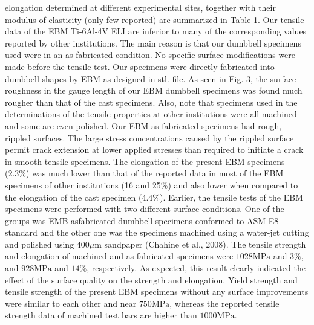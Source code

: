 \documentclass[10pt]{article}
\begin{document}
elongation determined at different experimental sites, together with their modulus of elasticity (only few reported) are summarized in Table 1. Our tensile data of the EBM Ti-6Al-4V ELI are inferior to many of the corresponding values reported by other institutions. The main reason is that our dumbbell specimens used were in an as-fabricated condition. No specific surface modifications were made before the tensile test. Our specimens were directly fabricated into dumbbell shapes by EBM as designed in stl. file. As seen in Fig. 3, the surface roughness in the gauge length of our EBM dumbbell specimens was found much rougher than that of the cast specimens. Also, note that specimens used in the determinations of the tensile properties at other institutions were all machined and some are even polished. Our EBM as-fabricated specimens had rough, rippled surfaces. The large stress concentrations caused by the rippled surface permit crack extension at lower applied stresses than required to initiate a crack in smooth tensile specimens. The elongation of the present EBM specimens (2.3\%) was much lower than that of the reported data in most of the EBM specimens of other institutions (16 and 25\%) and also lower when compared to the elongation of the cast specimen (4.4\%). Earlier, the tensile tests of the EBM specimens were performed with two different surface conditions. One of the groups was EMB asfabricated dumbbell specimens conformed to ASM E8 standard and the other one was the specimens machined using a water-jet cutting and polished using $400 \mu \mathrm{m}$ sandpaper (Chahine et al., 2008). The tensile strength and elongation of machined and as-fabricated specimens were $1028 \mathrm{MPa}$ and $3 \%$, and $928 \mathrm{MPa}$ and $14 \%$, respectively. As expected, this result clearly indicated the effect of the surface quality on the strength and elongation. Yield strength and tensile strength of the present EBM specimens without any surface improvements were similar to each other and near $750 \mathrm{MPa}$, whereas the reported tensile strength data of machined test bars are higher than $1000 \mathrm{MPa}$.
\end{document}

